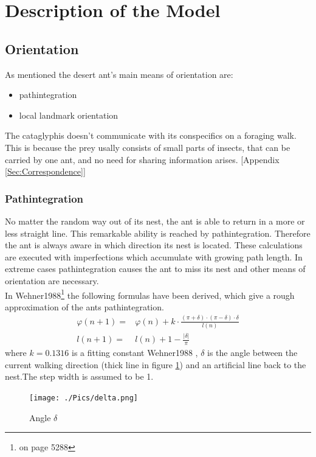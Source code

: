 \documentclass[11pt]{article}
\begin{document}
\section{Description of the Model}
\subsection{Orientation}
As mentioned the desert ant's main means of orientation are:
\begin{itemize}
\item pathintegration
\item local landmark orientation
\end{itemize}
The cataglyphis doesn't communicate with its conspecifics on a foraging walk.
This is because the prey usally consists of small parts of insects, that can be carried by one ant, and no need for sharing information arises. [Appendix \ref{Sec:Correspondence}]




\subsubsection{Pathintegration}\label{Sec:PathIntegration}
No matter the random way out of its nest, the ant is able to return in a more or less straight line. This remarkable ability is reached by pathintegration. Therefore the ant is always aware in which direction its nest is located. These calculations are executed with imperfections which accumulate with growing path length. In extreme cases pathintegration causes the ant to miss its nest and other means of orientation are necessary. \\
In Wehner1988\cite{Wehner1988}\footnote{on page 5288} the following formulas have been derived, which give a rough approximation of the ants pathintegration.
\begin{align*}
\varphi(n+1) =& \varphi(n) +k \cdot \frac{(\pi +\delta)\cdot(\pi-\delta)\cdot \delta}{l(n)}\\
l(n+1) =& l(n) +1 -\frac{|\delta|}{\pi}
\end{align*}
where $k=0.1316$ is a fitting constant Wehner1988 \cite{Wehner1988}, $\delta$ is the angle between the current walking direction (thick line in figure \ref{fig:Delta}) and an artificial line back to the nest.The step width is assumed to be 1.

\begin{figure}[H]
\centering
\texttt{[image: ./Pics/delta.png]} 
\caption{Angle $\delta$ \label{fig:Delta} }
\end{figure} 
\end{document}
